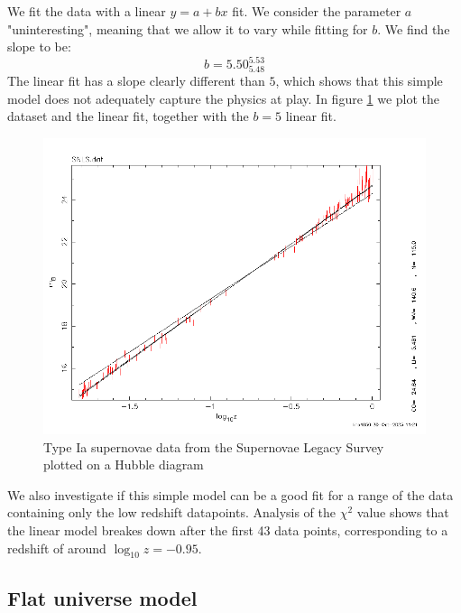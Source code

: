 \documentclass[11pt]{article}
\begin{document}
We fit the data with a linear $y = a + bx$ fit. We consider the parameter $a$ "uninteresting", meaning that we allow it to vary while fitting for $b$. We find the slope to be: 
\begin{equation}
	b = 5.50^{5.53}_{5.48}
	\label{res:lin}
\end{equation}
The linear fit has a slope clearly different than $5$, which shows that this simple model does not adequately capture the physics at play. In figure \ref{fig:snls} we plot the dataset and the linear fit, together with the $b = 5$ linear fit. 
\begin{figure}[htbp]
	\centering
	\includegraphics[width=0.8\linewidth]{snls.png}
	\caption{Type Ia supernovae data from the Supernovae Legacy Survey plotted on a Hubble diagram}
	\label{fig:snls}
\end{figure}
We also investigate if this simple model can be a good fit for a range of the data containing only the low redshift datapoints. Analysis of the $\chi^2$ value shows that the linear model breakes down after the first 43 data points, corresponding to a redshift of around $\log_{10}z = -0.95$. 

\subsection{Flat universe model}
\end{document}
